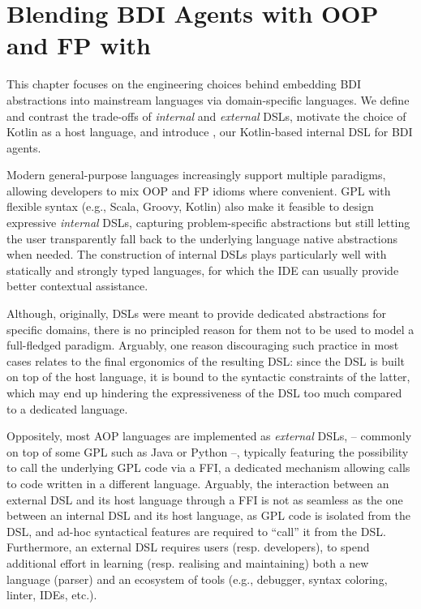 \chapter{Blending BDI Agents with \acs{OOP} and \ac{FP} with \jakta{}}
\label{chap:jakta}

This chapter focuses on the engineering choices behind embedding \ac{BDI} abstractions into mainstream languages via domain-specific languages. 
%
We define and contrast the trade-offs of \emph{internal} and \emph{external} \acp{DSL},
motivate the choice of Kotlin as a host language, 
and introduce \jakta{}, 
our Kotlin-based internal \ac{DSL} for \ac{BDI} agents.

Modern general-purpose languages increasingly support multiple paradigms, 
allowing developers to mix \ac{OOP} and \ac{FP} idioms where convenient. 
%
\ac{GPL} with flexible syntax (e.g., Scala, Groovy, Kotlin) 
also make it feasible to design expressive \emph{internal} \acp{DSL},
capturing problem-specific abstractions but still letting the user transparently fall back to the underlying
language native abstractions when needed.
%
The construction of internal \acp{DSL} plays particularly well with statically and strongly typed languages,
for which the \ac{IDE} can usually provide better contextual assistance.

Although, originally,
\acp{DSL} were meant to provide dedicated abstractions for specific domains,
there is no principled reason for them not to be used to model a full-fledged paradigm.
%
Arguably,
one reason discouraging such practice in most cases relates to the final ergonomics of the resulting \ac{DSL}:
since the \ac{DSL} is built on top of the host language,
it is bound to the syntactic constraints of the latter,
which may end up hindering the expressiveness of the \ac{DSL} too much compared to a dedicated language.

Oppositely,
most AOP languages are implemented as \emph{external} \acp{DSL},
-- commonly on top of some \ac{GPL} such as Java or Python --,
typically featuring the possibility to call the underlying \ac{GPL} code
via a \ac{FFI},
a dedicated mechanism allowing calls to code written in a different language.
%
Arguably,
the interaction between an external \ac{DSL}
and its host language through a \ac{FFI} is not as seamless as the one between an internal \ac{DSL} and its host language,
as GPL code is isolated from the \ac{DSL},
and ad-hoc syntactical features are required to ``call'' it from the \ac{DSL}.
%
Furthermore,
an external \ac{DSL} requires users (resp. developers),
to spend additional effort in learning (resp. realising and maintaining)
both a new language (parser) and
an ecosystem of tools
(e.g., debugger, syntax coloring, linter, \acp{IDE}, etc.).

